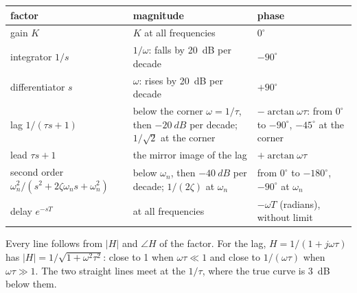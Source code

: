 \begin{result}
\begin{center}\small
\renewcommand{\arraystretch}{1.45}
\begin{tabularx}{\linewidth}{@{}l>{\raggedright\arraybackslash}X>{\raggedright\arraybackslash}X@{}}
\toprule
factor & magnitude & phase\\
\midrule
gain $K$ & $K$ at all frequencies & $0^\circ$\\
integrator $1/s$ & $1/\omega$: falls by \SI{20}{dB} per decade & $-90^\circ$\\
differentiator $s$ & $\omega$: rises by \SI{20}{dB} per decade & $+90^\circ$\\
lag $1/(\tau s + 1)$ & 1 below the corner $\omega = 1/\tau$, then $-\SI{20}{dB}$ per decade; $1/\sqrt2$ at the corner & $-\arctan\omega\tau$: from $0^\circ$ to $-90^\circ$, $-45^\circ$ at the corner\\
lead $\tau s + 1$ & the mirror image of the lag & $+\arctan\omega\tau$\\
second order $\omega_n^2/(s^2 + 2\zeta\omega_ns + \omega_n^2)$ & 1 below $\omega_n$, then $-\SI{40}{dB}$ per decade; $1/(2\zeta)$ at $\omega_n$ & from $0^\circ$ to $-180^\circ$, $-90^\circ$ at $\omega_n$\\
delay $e^{-sT}$ & 1 at all frequencies & $-\omega T$ (radians), without limit\\
\bottomrule
\end{tabularx}
\end{center}
\end{result}

Every line follows from $|H|$ and $\angle H$ of the factor. For the lag, $H = 1/(1 + j\omega\tau)$ has $|H| = 1/\sqrt{1 + \omega^2\tau^2}$: close to 1 when $\omega\tau \ll 1$ and close to $1/(\omega\tau)$ when $\omega\tau \gg 1$. The two straight lines meet at the  $1/\tau$, where the true curve is \SI{3}{dB} below them.

